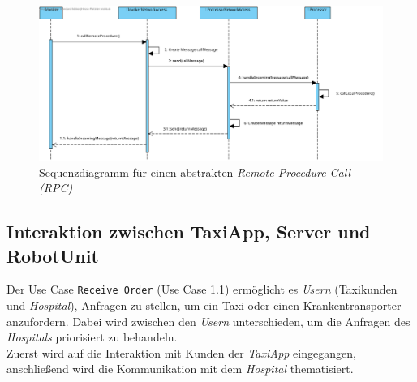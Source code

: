 \begin{figure}[H]
	\centering
	\includegraphics[height=0.75\textwidth, angle=90]{img/2-Entwurf-Communication_RPC}
	\caption{Sequenzdiagramm für einen abstrakten \emph{Remote Procedure Call (RPC)}}
	\label{SequenzDiagrammRPC}
\end{figure}

\subsection*{Interaktion zwischen TaxiApp, Server und RobotUnit}

Der Use Case \texttt{Receive Order} (Use Case 1.1) ermöglicht es \emph{Usern} (Taxikunden und \emph{Hospital}), Anfragen zu stellen, um ein Taxi oder einen Krankentransporter anzufordern. Dabei wird zwischen den \emph{Usern} unterschieden, um die Anfragen des \emph{Hospitals} priorisiert zu behandeln.\\
Zuerst wird auf die Interaktion mit Kunden der \emph{TaxiApp} eingegangen, anschließend wird die Kommunikation mit dem \emph{Hospital} thematisiert. \\ \\

